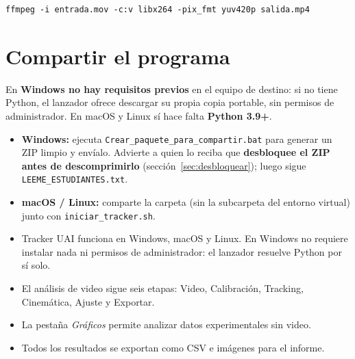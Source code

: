 \documentclass[11pt,a4paper]{article}
\begin{document}
\begin{lstlisting}[caption={Convertir un video a H.264.}]
ffmpeg -i entrada.mov -c:v libx264 -pix_fmt yuv420p salida.mp4
\end{lstlisting}

\section{Compartir el programa}

En \textbf{Windows no hay requisitos previos} en el equipo de destino: si no
tiene Python, el lanzador ofrece descargar su propia copia portable, sin
permisos de administrador. En macOS y Linux sí hace falta \textbf{Python 3.9+}.

\begin{receta}[Distribución]
  \begin{itemize}
    \item \textbf{Windows:} ejecuta \texttt{Crear\_paquete\_para\_compartir.bat}
      para generar un ZIP limpio y envíalo. Advierte a quien lo reciba que
      \textbf{desbloquee el ZIP antes de descomprimirlo}
      (sección~\ref{sec:desbloquear}); luego sigue
      \texttt{LEEME\_ESTUDIANTES.txt}.
    \item \textbf{macOS / Linux:} comparte la carpeta (sin la subcarpeta del
      entorno virtual) junto con \texttt{iniciar\_tracker.sh}.
  \end{itemize}
\end{receta}

\begin{resumen}
  \begin{itemize}
    \item Tracker UAI funciona en Windows, macOS y Linux. En Windows no requiere
      instalar nada ni permisos de administrador: el lanzador resuelve Python
      por sí solo.
    \item El análisis de video sigue seis etapas: Video, Calibración, Tracking,
      Cinemática, Ajuste y Exportar.
    \item La pestaña \emph{Gráficos} permite analizar datos experimentales sin video.
    \item Todos los resultados se exportan como CSV e imágenes para el informe.
  \end{itemize}
\end{resumen}
\end{document}
